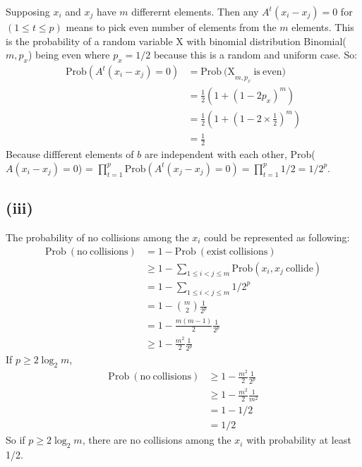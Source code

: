 \documentclass[twoside,11pt]{homework}
\begin{document}
Supposing $x_i$ and $x_j$ have $m$ differernt elements.
Then any $A^t(x_i - x_j) = 0$ for  $(1 \le t \le p)$ means to pick even number of elements from the $m$ elements.
This is the probability of a random variable X with binomial distribution Binomial($m, p_x$) being even where $p_x = 1/2$ because this is a random and uniform case.
So:
\begin{equation}
\begin{split}
\mathrm{Prob}(A^t(x_i - x_j) = 0) &= \mathrm{Prob\ (X}_{m, p_x}\mathrm{\ is\ even})\\
&= \frac{1}{2} (1 + (1-2p_x)^m) \\
&= \frac{1}{2} (1 + (1-2 \times \frac{1}{2})^m) \\
&= \frac{1}{2}
\end{split}
\end{equation}
Because diffferent elements of $b$ are independent with each other,
Prob($A(x_i - x_j) = 0$) = $\prod\limits_{t=1}^p \mathrm{Prob}(A^t(x_j - x_j) = 0) = \prod\limits_{t=1}^p 1/2 = 1/2^p.$


\subsection*{(iii)}
The probability of no collisions among the $x_i$ could be represented as following:
%
\begin{equation}
\begin{split}
\mathrm{Prob\ (no\ collisions)} &= 1 - \mathrm{Prob\ (exist\ collisions)} \\
				       &\ge 1 - \sum\limits_{1\le i <j \le m} \mathrm{Prob}(x_i, x_j \mathrm{\ collide})\\
				       &= 1 -  \sum\limits_{1\le i <j \le m} 1/2^p \\
				       &= 1 - \binom{m}{2} \frac{1}{2^p} \\
				       &= 1- \frac{m(m-1)}{2}\frac{1}{2^p} \\
				       &\ge 1 - \frac{m^2}{2}\frac{1}{2^p}
\end{split}
\end{equation}
%
 If $p \ge 2 \log_2 m$,
\begin{equation}
\begin{split}
\mathrm{Prob\ (no\ collisions)} &\ge  1- \frac{m^2}{2}\frac{1}{2^p} \\
					&\ge 1 - \frac{m^2}{2} \frac{1}{m^2} \\
					&= 1 - 1/2 \\
					&= 1/2
\end{split}
\end{equation}
%
 So if  $p \ge 2 \log_2 m$, there are no collisions among the $x_i$ with probability at least 1/2.
 
\end{document}
